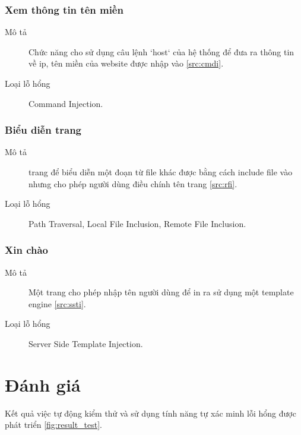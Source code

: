 \documentclass[./../main.tex]{subfiles}
\begin{document}
\subsubsection{Xem thông tin tên miền}

\begin{description}
	\item[Mô tả] Chức năng cho sử dụng câu lệnh `host` của hệ thống để đưa ra thông tin về ip, tên miền của website được nhập vào \ref{src:cmdi}.
	\item[Loại lỗ hổng] Command Injection.
\end{description}

\subsubsection{Biểu diễn trang}

\begin{description}
	\item[Mô tả] trang để biểu diễn một đoạn từ file khác được bằng cách
	      include file vào nhưng cho phép người dùng điều chính tên trang \ref{src:rfi}.
	\item[Loại lỗ hổng] Path Traversal, Local File Inclusion, Remote
	      File Inclusion.
\end{description}

\subsubsection{Xin chào}

\begin{description}
	\item[Mô tả] Một trang cho phép nhập tên người dùng để in ra sử dụng một template engine \ref{src:ssti}.
	\item[Loại lỗ hổng] Server Side Template Injection.
\end{description}


\section{Đánh giá}

Kết quả việc tự động kiểm thử và sử dụng tính năng tự xác minh lỗi
hổng được phát triển \ref{fig:result_test}.
\end{document}
